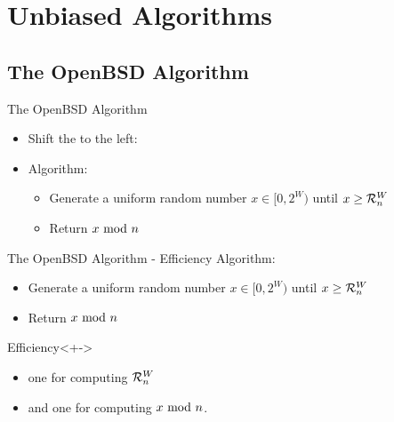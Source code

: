\section{Unbiased Algorithms}

\subsection{The OpenBSD Algorithm}\label{sec:2.1}
\begin{frame}{The OpenBSD Algorithm}
    \pause 
    \begin{itemize}[<+->]
        \item Shift the  to the left:
        \item Algorithm: \begin{itemize}[<+->]
            \item Generate a uniform random number $x \in [0,2^W)$ until $x \geq \mathcal{R}_n^W$
            \item Return $x \ \mathrm{mod}\ n$
        \end{itemize} 
    \end{itemize}

\end{frame}

\begin{frame}{The OpenBSD Algorithm - Efficiency}
    Algorithm: \begin{itemize}
        \item Generate a uniform random number $x \in [0,2^W)$ until $x \geq \mathcal{R}_n^W$
        \item Return $x \ \mathrm{mod}\ n$
    \end{itemize} 
    \pause 
    \vspace*{0.5cm}
    \begin{block}{Efficiency}<+->
         \begin{itemize}[<+->]
            \item one for computing $\mathcal{R}_n^W$
            \item and one for computing $x \ \mathrm{mod}\ n$.
        \end{itemize}
    \end{block}
\end{frame}



